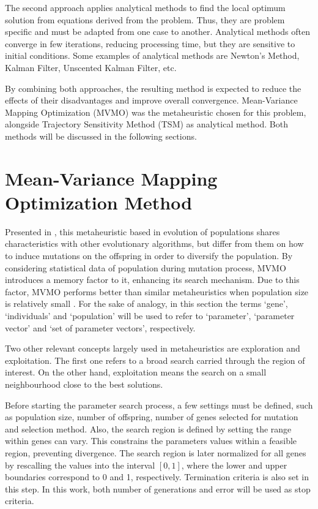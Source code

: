 The second approach applies analytical methods to find the local optimum solution from equations derived from the problem. Thus, they are problem specific and must be adapted from one case to another. Analytical methods often converge in few iterations, reducing processing time, but they are sensitive to initial conditions. Some examples of analytical methods are Newton's Method, Kalman Filter, Unscented Kalman Filter, etc.

By combining both approaches, the resulting method is expected to reduce the effects of their disadvantages and improve overall convergence. Mean-Variance Mapping Optimization (MVMO) was the metaheuristic chosen for this problem, alongside Trajectory Sensitivity Method (TSM) as analytical method. Both methods will be discussed in the following sections.

\section{Mean-Variance Mapping Optimization Method}

Presented in \cite{Erlich2010}, this metaheuristic based in evolution of populations shares characteristics with other evolutionary algorithms, but differ from them on how to induce mutations on the offspring in order to diversify the population. By considering statistical data of population during mutation process, MVMO introduces a memory factor to it, enhancing its search mechanism. Due to this factor, MVMO performs better than similar metaheuristics when population size is relatively small \cite{Nakawiro2011}. For the sake of analogy, in this section the terms `gene', `individuals' and `population' will be used to refer to `parameter', `parameter vector' and `set of parameter vectors', respectively.

Two other relevant concepts largely used in metaheuristics are exploration and exploitation. The first one refers to a broad search carried through the region of interest. On the other hand, exploitation means the search on a small neighbourhood close to the best solutions.

Before starting the parameter search process, a few settings must be defined, such as population size, number of offspring, number of genes selected for mutation and selection method. Also, the search region is defined by setting the range within genes can vary. This constrains the parameters values within a feasible region, preventing divergence. The search region is later normalized for all genes  by rescalling the values into the interval $[0, 1]$, where the lower and upper boundaries correspond to 0 and 1, respectively. Termination criteria is also set in this step. In this work, both number of generations and error will be used as stop criteria.

